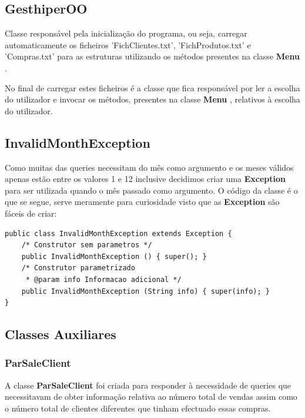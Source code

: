 \documentclass[10pt] {article}
\begin{document}
\subsection{GesthiperOO}
\par Classe responsável pela inicialização do programa, ou seja, carregar automaticamente os ficheiros 'FichClientes.txt',
'FichProdutos.txt' e 'Compras.txt' para as estruturas utilizando os métodos presentes na classe
\color{blue} \textbf{Menu} \color{black}.
\par No final de carregar estes ficheiros é a classe que fica responsável por ler a escolha do utilizador e invocar os métodos,
presentes na classe \color{blue} \textbf{Menu} \color{black}, relativos à escolha do utilizador.

\subsection{InvalidMonthException}
\par Como muitas das queries necessitam do mês como argumento e os meses válidos apenas estão entre os valores 1 e 12
inclusive decidimos criar uma \color{blue} \textbf{Exception} \color{black} para ser utilizada quando o mês passado como
argumento. O código da classe é o que se segue, serve meramente para curiosidade visto que as \color{blue}
\textbf{Exception} \color{black} são fáceis de criar:

\begin{lstlisting}
public class InvalidMonthException extends Exception {
	/* Construtor sem parametros */
	public InvalidMonthException () { super(); }
	/* Construtor parametrizado
	 * @param info Informacao adicional */
	public InvalidMonthException (String info) { super(info); }
}
\end{lstlisting}

\subsection{Classes Auxiliares}
\subsubsection{ParSaleClient}

A classe \color{blue} \textbf{ParSaleClient} \color{black} foi criada para responder à necessidade de queries que necessitavam de obter informação relativa ao número total de vendas assim como o número total de clientes diferentes que tinham efectuado essas compras.
\end{document}

